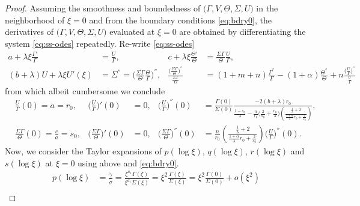 \documentclass[a4paper,11pt]{article}
\def\tg{{\tilde{\gamma}}}
\def\ts{{\tilde{\sigma}}}
\theoremstyle{remark}
\begin{document}
\begin{proof}
Assuming the smoothness and boundedness of $\big(\Gamma,V,\Theta,\Sigma,U\big)$ in the neighborhood of $\xi=0$ and from the boundary conditions \eqref{eq:bdry0}, the derivatives of $\big(\Gamma,V,\Theta,\Sigma,U\big)$ evaluated at $\xi=0$ are obtained by differentiating the system \eqref{eq:ss-odes} repeatedly.
Re-write \eqref{eq:ss-odes}
\begin{align*}
  a + \lambda\xi\frac{\Gamma'}{\Gamma} &= \frac{U}{\Gamma}, &
  c + \lambda\xi\frac{\Theta'}{\Theta} &= \frac{\Sigma\Gamma}{\Theta} \frac{U}{\Gamma},\\
  (b+\lambda)U  + \lambda \xi U'(\xi) &= \Sigma^{''} = \Big(\frac{\Sigma\Gamma}{\Theta} \frac{\Theta}{\Gamma}\Big)^{''}, &
  \frac{\Big(\frac{\Sigma\Gamma}{\Theta}\Big)^{''}}{\frac{\Sigma\Gamma}{\Theta}} &= (1+m+n)\frac{\Gamma^{''}}{\Gamma}-(1+\alpha) \frac{\Theta^{''}}{\Theta} + n \frac{ \big(\frac{U}{\Gamma}\big)^{''}}{\frac{U}{\Gamma}}
\end{align*}
from which albeit cumbersome we conclude
\begin{align*}
&\frac{U}{\Gamma}(0) = a = r_0,  & \Big(\frac{U}{\Gamma}\Big)'(0)&=0, & \Big(\frac{U}{\Gamma}\Big)^{''}(0) &= \frac{\Gamma(0)}{\Sigma(0)} \frac{-2(b+\lambda)r_0}{\frac{1-s_0}{\lambda}-\frac{n}{r_0}\Big(\frac{2}{s_0} + \frac{r_0}{\lambda}\Big)\left(\frac{ \frac{1}{\lambda}+2}{ \frac{1+\alpha}{\lambda}r_0 + \frac{2}{s_0}}\right)},\\
&\frac{\Sigma\Gamma}{\Theta}(0) = \frac{c}{a} = s_0,  & \Big(\frac{\Sigma\Gamma}{\Theta}\Big)'(0)&=0, &
\Big(\frac{\Sigma\Gamma}{\Theta}\Big)^{''}(0) &= \frac{n}{r_0} \left(\frac{ \frac{1}{\lambda}+2 }{ \frac{1+\alpha}{\lambda}r_0 + \frac{2}{s_0}}\right)\Big(\frac{U}{\Gamma}\Big)^{''}(0).
\end{align*}
Now, we consider the Taylor expansions of $p(\log\xi)$, $q(\log\xi)$, $r(\log\xi)$ and $s(\log\xi)$ at $\xi=0$ using above and \eqref{eq:bdry0}.
\begin{align*}
 p(\log\xi) &= \frac{ \tg }{\ts} = \frac{ \xi^{a_1} \Gamma(\xi)}{\xi^{d_1} \Sigma(\xi)} = \xi^2\frac{\Gamma(\xi)}{\Sigma(\xi)} = \xi^2\frac{\Gamma(0)}{\Sigma(0)} + o(\xi^2) \\

\end{align*}
\end{proof}
\end{document}
